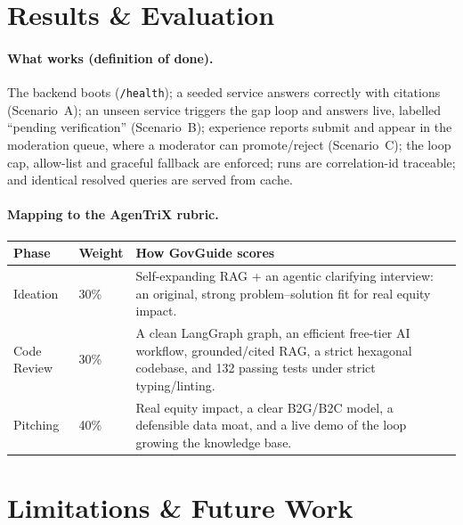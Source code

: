 \documentclass[11pt,a4paper]{article}
\begin{document}
\section{Results \& Evaluation}
\label{sec:results}

\paragraph{What works (definition of done).} The backend boots (\texttt{/health}); a seeded service
answers correctly with citations (Scenario~A); an unseen service triggers the gap loop and answers
live, labelled ``pending verification'' (Scenario~B); experience reports submit and appear in the
moderation queue, where a moderator can promote/reject (Scenario~C); the loop cap, allow-list and
graceful fallback are enforced; runs are correlation-id traceable; and identical resolved queries are
served from cache.

\paragraph{Mapping to the AgenTriX rubric.}
\begin{center}
\begin{tabularx}{\linewidth}{@{}l l Y@{}}
\toprule
\textbf{Phase} & \textbf{Weight} & \textbf{How GovGuide scores} \\
\midrule
Ideation & 30\% & Self-expanding RAG + an agentic clarifying interview: an original, strong
problem--solution fit for real equity impact. \\
Code Review & 30\% & A clean LangGraph graph, an efficient free-tier AI workflow, grounded/cited RAG,
a strict hexagonal codebase, and 132 passing tests under strict typing/linting. \\
Pitching & 40\% & Real equity impact, a clear B2G/B2C model, a defensible data moat, and a live demo
of the loop growing the knowledge base. \\
\bottomrule
\end{tabularx}
\end{center}

\section{Limitations \& Future Work}
\label{sec:future}
\end{document}
